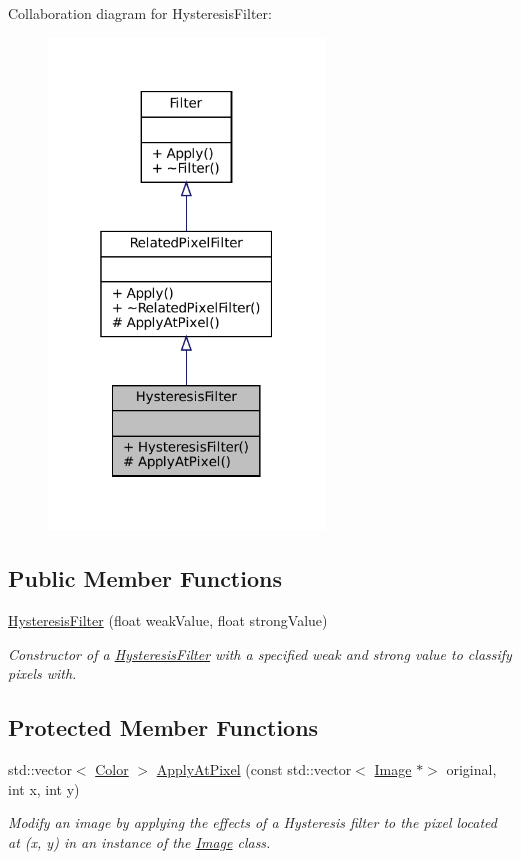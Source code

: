 Collaboration diagram for Hysteresis\+Filter\+:\nopagebreak
\begin{figure}[H]
\begin{center}
\leavevmode
\includegraphics[width=208pt]{classHysteresisFilter__coll__graph}
\end{center}
\end{figure}
\subsection*{Public Member Functions}
\begin{DoxyCompactItemize}
\item 
\hyperlink{classHysteresisFilter_add3251eef42f477d14fb9fae1ba40e95}{Hysteresis\+Filter} (float weak\+Value, float strong\+Value)
\begin{DoxyCompactList}\small\item\em Constructor of a \hyperlink{classHysteresisFilter}{Hysteresis\+Filter} with a specified weak and strong value to classify pixels with. \end{DoxyCompactList}\end{DoxyCompactItemize}
\subsection*{Protected Member Functions}
\begin{DoxyCompactItemize}
\item 
std\+::vector$<$ \hyperlink{classColor}{Color} $>$ \hyperlink{classHysteresisFilter_a43990169f3f075ba8063c21ae83a0fc3}{Apply\+At\+Pixel} (const std\+::vector$<$ \hyperlink{classImage}{Image} $\ast$$>$ original, int x, int y)
\begin{DoxyCompactList}\small\item\em Modify an image by applying the effects of a Hysteresis filter to the pixel located at (x, y) in an instance of the \hyperlink{classImage}{Image} class. \end{DoxyCompactList}\end{DoxyCompactItemize}


